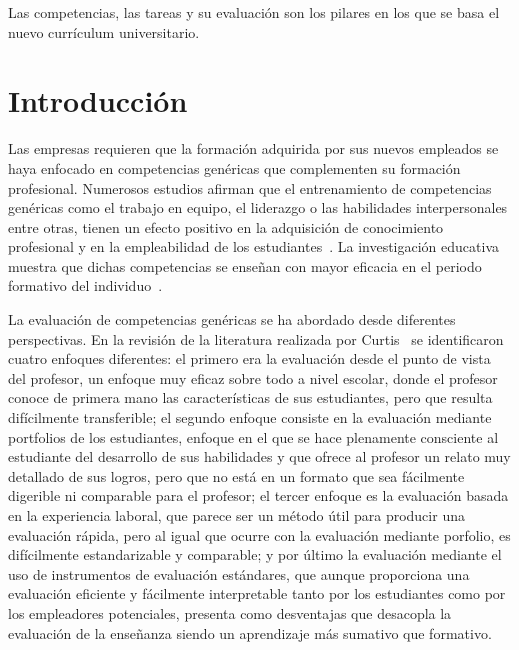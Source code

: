 



\begin{savequote}[50mm]
Las competencias, las tareas y su evaluación son los pilares en los que se basa el nuevo currículum universitario. 
\end{savequote}

\chapter{Introducción}
\label{cha:Introduction}

\ifpdf
    \graphicspath{{1_introduction/figures/PNG/}{1_introduction/figures/PDF/}{1_introduction/figures/}}
\else
    \graphicspath{{1_introduction/figures/EPS/}{1_introduction/figures/}}
\fi



Las empresas requieren que la formación adquirida por sus nuevos empleados se haya enfocado en competencias genéricas que complementen su formación profesional. Numerosos estudios afirman que el entrenamiento de competencias genéricas como el trabajo en equipo, el liderazgo o las habilidades interpersonales entre otras, tienen un efecto positivo en la adquisición de conocimiento profesional y en la empleabilidad de los estudiantes~\cite{ellis2005evaluation,mason2009employability}. La investigación educativa muestra que dichas competencias se enseñan con mayor eficacia en el periodo formativo del individuo~\cite{de2000quality}.

La evaluación de competencias genéricas se ha abordado desde diferentes perspectivas. En la revisión de la literatura realizada por Curtis~\cite{curtis2004assessment} se identificaron cuatro enfoques diferentes: el primero era la evaluación desde el punto de vista del profesor, un enfoque muy eficaz sobre todo a nivel escolar, donde el profesor conoce de primera mano las características de sus estudiantes, pero que resulta difícilmente transferible; el segundo enfoque consiste en la evaluación mediante portfolios de los estudiantes, enfoque en el que se hace plenamente consciente al estudiante del desarrollo de sus habilidades y que ofrece al profesor un relato muy detallado de sus logros, pero que no está en un formato que sea fácilmente digerible ni comparable para el profesor; el tercer enfoque es la evaluación basada en la experiencia laboral, que parece ser un método útil para producir una evaluación rápida, pero al igual que ocurre con la evaluación mediante porfolio, es difícilmente estandarizable y comparable; y por último la evaluación mediante el uso de instrumentos de evaluación estándares, que aunque proporciona una evaluación eficiente y fácilmente interpretable tanto por los estudiantes como por los empleadores potenciales, presenta como desventajas que desacopla la evaluación de la enseñanza siendo un aprendizaje más sumativo que formativo.

